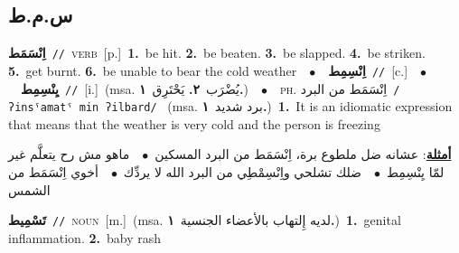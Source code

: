 \documentclass[10pt,a4paper,twoside]{article} %
\begin{document}
\begin{multicols}{2}
\vspace{-3mm}
\subsection*{\color{blue}\foreignlanguage{arabic}{س.م.ط}\color{blue}{}} 

{\setlength\topsep{0pt}\textbf{\foreignlanguage{arabic}{اِنْسَمَط}}\ {\color{gray}\texttt{//}\color{black}}\ \textsc{verb}\ [p.]\ \textbf{1.}~be hit.  \textbf{2.}~be beaten.  \textbf{3.}~be slapped.  \textbf{4.}~be striken.  \textbf{5.}~get burnt.  \textbf{6.}~be unable to bear the cold weather\ \ $\bullet$\ \ \setlength\topsep{0pt}\textbf{\foreignlanguage{arabic}{اِنْسِمِط}}\ {\color{gray}\texttt{//}\color{black}}\ [c.]\ \ $\bullet$\ \ \setlength\topsep{0pt}\textbf{\foreignlanguage{arabic}{يِنْسِمِط}}\ {\color{gray}\texttt{//}\color{black}}\ [i.]\ \color{gray}(msa. \foreignlanguage{arabic}{يُضْرَب}~\foreignlanguage{arabic}{\textbf{٢.}}  \foreignlanguage{arabic}{يَحْتَرِق}~\foreignlanguage{arabic}{\textbf{١.}})\color{black}\ \ $\bullet$\ \ \textsc{ph.} \color{gray} \foreignlanguage{arabic}{اِنْسَمَط من البرد}\color{black}\ {\color{gray}\texttt{/{\sffamily ʔinsˤamatˤ min ʔilbard}/}\color{black}}\ \color{gray} (msa. \foreignlanguage{arabic}{برد شديد}~\foreignlanguage{arabic}{\textbf{١.}})\color{black}\ \textbf{1.}~It is an idiomatic expression that means that the weather is very cold and the person is freezing\  \begin{flushright}\color{gray}\foreignlanguage{arabic}{\textbf{\underline{\foreignlanguage{arabic}{أمثلة}}}: عشانه ضل ملطوع برة، اِنْسَمَط من البرد المسكين\ $\bullet$\ \  ماهو مش رح يتعلَّم غير لمّا يِنْسِمِط\ $\bullet$\ \  ضلك تشلحي واِنْسِمْطِي من البرد الله لا يردِّك\ $\bullet$\ \  أخوي اِنْسَمَط من الشمس}\end{flushright}\color{black}} \vspace{2mm}

{\setlength\topsep{0pt}\textbf{\foreignlanguage{arabic}{تَسْمِيط}}\ {\color{gray}\texttt{//}\color{black}}\ \textsc{noun}\ [m.]\ \color{gray}(msa. \foreignlanguage{arabic}{لديه إِلتهاب بالأعضاء الجنسية}~\foreignlanguage{arabic}{\textbf{١.}})\color{black}\ \textbf{1.}~genital inflammation.  \textbf{2.}~baby rash\ } \vspace{2mm}


\end{multicols}
\end{document}
